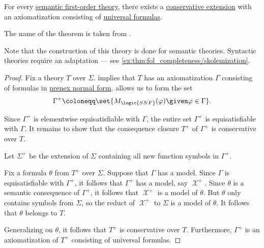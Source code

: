 \begin{theorem}\label{thm:skolems_theorem}
  For every \hyperref[def:fol_theory]{semantic first-order theory}, there exists a \hyperref[def:fol_theory/conservative]{conservative extension} with an axiomatization consisting of \hyperref[def:fol_prenex_normal_form/universal]{universal formulas}.
\end{theorem}
\begin{comments}
  \item The name of the theorem is taken from \cite[56]{Shoenfield1967MathematicalLogic}.
  \item Note that the construction of this theory is done for semantic theories. Syntactic theories require an adaptation --- see \cref{ex:thm:fol_completeness/skolemization}.
\end{comments}
\begin{proof}
  Fix a theory \( T \) over \( \Sigma \).  implies that \( T \) has an axiomatization \( \Gamma \) consisting of formulas in \hyperref[def:fol_prenex_normal_form]{prenex normal form}.  allows us to form the set
  \begin{equation*}
    \Gamma^+ \coloneqq \set{ M_{\logic{SNF}}(\varphi) \given \varphi \in \Gamma }.
  \end{equation*}

  Since \( \Gamma^+ \) is elementwise equisatisfiable with \( \Gamma \), the entire set \( \Gamma^+ \) is equisatisfiable with \( \Gamma \). It remains to show that the consequence closure \( T^+ \) of \( \Gamma^+ \) is conservative over \( T \).

  Let \( \Sigma^+ \) be the extension of \( \Sigma \) containing all new function symbols in \( \Gamma^+ \).

  Fix a formula \( \theta \) from \( T^+ \) over \( \Sigma \). Suppose that \( \Gamma \) has a model. Since \( \Gamma \) is equisatisfiable with \( \Gamma^+ \), it follows that \( \Gamma^+ \) has a model, say \( \mscrX^+ \). Since \( \theta \) is a semantic consequence of \( \Gamma^+ \), it follows that \( \mscrX^+ \) is a model of \( \theta \). But \( \theta \) only contains symbols from \( \Sigma \), so the reduct of \( \mscrX^+ \) to \( \Sigma \) is a model of \( \theta \). It follows that \( \theta \) belongs to \( T \).

  Generalizing on \( \theta \), it follows that \( T^+ \) is conservative over \( T \). Furthermore, \( \Gamma^+ \) is an axiomatization of \( T^+ \) consisting of universal formulas.
\end{proof}

